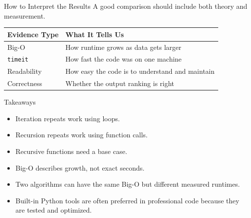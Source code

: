 \documentclass[11pt,aspectratio=43]{beamer}
\begin{document}
%
%

\begin{frame}{How to Interpret the Results}
  A good comparison should include both theory and measurement.

  \begin{center}
    \small
    \begin{tabular}{p{} p{}}
      \toprule
      Evidence Type & What It Tells Us \\
      \midrule
      Big-O & How runtime grows as data gets larger \\
      \texttt{timeit} & How fast the code was on one machine \\
      Readability & How easy the code is to understand and maintain \\
      Correctness & Whether the output ranking is right \\
      \bottomrule
    \end{tabular}
  \end{center}
\end{frame}

\begin{frame}{Takeaways}
  \begin{itemize}
    \item Iteration repeats work using loops.
    \item Recursion repeats work using function calls.
    \item Recursive functions need a base case.
    \item Big-O describes growth, not exact seconds.
    \item Two algorithms can have the same Big-O but different measured runtimes.
    \item Built-in Python tools are often preferred in professional code because they are tested and optimized.
  \end{itemize}
\end{frame}
\end{document}
